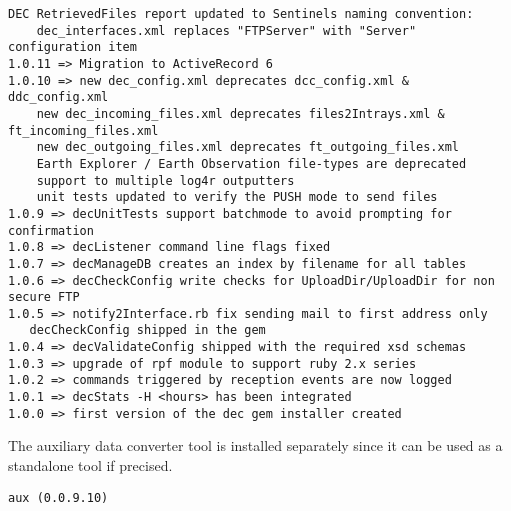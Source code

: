 \documentclass[dec_sum_main.tex]{subfiles}
\begin{document}
\begin{Verbatim}[tabsize=4]
    DEC RetrievedFiles report updated to Sentinels naming convention:
    dec_interfaces.xml replaces "FTPServer" with "Server" configuration item
1.0.11 => Migration to ActiveRecord 6
1.0.10 => new dec_config.xml deprecates dcc_config.xml & ddc_config.xml
    new dec_incoming_files.xml deprecates files2Intrays.xml & ft_incoming_files.xml
    new dec_outgoing_files.xml deprecates ft_outgoing_files.xml
    Earth Explorer / Earth Observation file-types are deprecated
    support to multiple log4r outputters
    unit tests updated to verify the PUSH mode to send files
1.0.9 => decUnitTests support batchmode to avoid prompting for confirmation
1.0.8 => decListener command line flags fixed
1.0.7 => decManageDB creates an index by filename for all tables
1.0.6 => decCheckConfig write checks for UploadDir/UploadDir for non secure FTP
1.0.5 => notify2Interface.rb fix sending mail to first address only
   decCheckConfig shipped in the gem
1.0.4 => decValidateConfig shipped with the required xsd schemas
1.0.3 => upgrade of rpf module to support ruby 2.x series
1.0.2 => commands triggered by reception events are now logged
1.0.1 => decStats -H <hours> has been integrated
1.0.0 => first version of the dec gem installer created
\end{Verbatim}

\par
\noindent 
The auxiliary data converter tool is installed separately since it can be used as a standalone tool if precised. \newline


\begin{Verbatim}[tabsize=4]
    aux (0.0.9.10)
\end{Verbatim}

\end{document}
